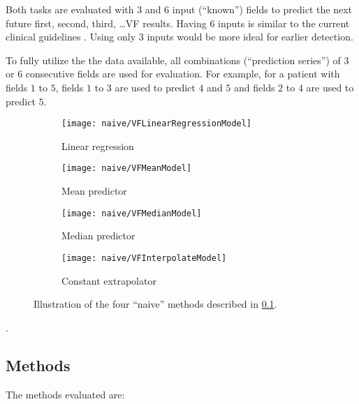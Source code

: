 Both tasks are evaluated with $3$ and $6$ input (``known'') fields to predict the next future first, second, third, \ldots \ac{VF} results. Having $6$ inputs is similar to the current clinical guidelines \cite{Chauhan2008}. Using only $3$ inputs would be more ideal for earlier detection. 

To fully utilize the the data available, all combinations (``prediction series'') of $3$ or $6$ consecutive fields are used for evaluation. For example, for a patient with fields $1$ to $5$, fields $1$ to $3$ are used to predict $4$ and $5$ and fields $2$ to $4$ are used to predict $5$. 

\begin{figure}[t]
	\centering
	\begin{subfigure}[b]{0.49\textwidth}
		\centering
		\texttt{[image: naive/VFLinearRegressionModel]}
		\caption{Linear regression}
	\end{subfigure}
	\hfill
	\begin{subfigure}[b]{0.49\textwidth}
		\centering
		\texttt{[image: naive/VFMeanModel]}
		\caption{Mean predictor}
	\end{subfigure}
	\hfill
	\begin{subfigure}[b]{0.49\textwidth}
		\centering
		\texttt{[image: naive/VFMedianModel]}
		\caption{Median predictor}
	\end{subfigure}
	\hfill
	\begin{subfigure}[b]{0.49\textwidth}
		\centering
		\texttt{[image: naive/VFInterpolateModel]}
		\caption{Constant extrapolator}
	\end{subfigure}
	\caption{Illustration of the four ``naive'' methods described in \cref{naivemethods}.}
\end{figure}. 


\subsection{Methods} \label{naivemethods}

The methods evaluated are:

